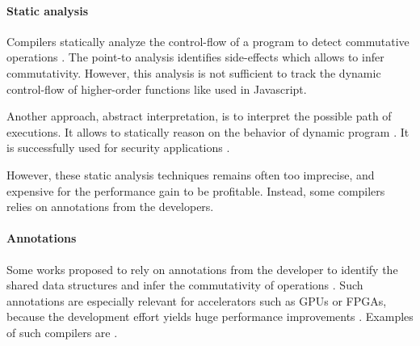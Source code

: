 


\paragraph{Static analysis}

Compilers statically analyze the control-flow of a program to detect commutative operations \cite{Allen1970}.
The point-to analysis identifies side-effects \cite{Andersen1994,Jang2009,Sridharan2012,Wei2014} which allows to infer commutativity.
However, this analysis is not sufficient to track the dynamic control-flow of higher-order functions \cite{Shivers1991} like used in Javascript.

Another approach, abstract interpretation, is to interpret the possible path of executions.
It allows to statically reason on the behavior of dynamic program \cite{Maffeis2008,Smith2011,Gardner2012,Hackett2012,Raychev2013,Gardner2013,Bodin2014}.
It is successfully used for security applications \cite{Huang2004,Jovanovic2006,Yu2007,Maffeis2009a,Chudnov2015,Dolby2015}.

However, these static analysis techniques remains often too imprecise, and expensive for the performance gain to be profitable.
Instead, some compilers relies on annotations from the developers.

\paragraph{Annotations}

Some works proposed to rely on annotations from the developer to identify the shared data structures and infer the commutativity of operations \cite{Vandierendonck2010a,Fernandez2014a}.
Such annotations are especially relevant for accelerators such as GPUs or FPGAs, because the development effort yields huge performance improvements \cite{Tarditi2006}.
Examples of such compilers are .

